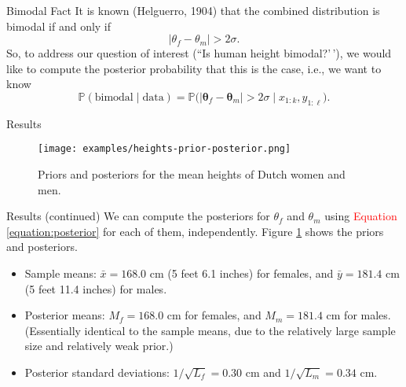 \documentclass[
  ignorenonframetext,
]{beamer}
\newcommand{\btheta}{{\bm\theta}}
\renewcommand{\Pr}{\mathbb{P}}
\begin{document}
\begin{frame}{Bimodal Fact}
\protect\hypertarget{bimodal-fact}{}
It is known (Helguerro, 1904) that the combined distribution is bimodal
if and only if \[ |\theta_f-\theta_m|>2\sigma. \] So, to address our
question of interest (``Is human height bimodal?'\,'), we would like to
compute the posterior probability that this is the case, i.e., we want
to know
\[ \Pr(\text{bimodal}\mid \text{data}) = \Pr\big(|\btheta_f-\btheta_m|>2\sigma \mid x_{1:k},y_{1:\ell}\big).\]
\end{frame}

\begin{frame}{Results}
\protect\hypertarget{results}{}
\begin{figure}
  \begin{center}
    \texttt{[image: examples/heights-prior-posterior.png]}
  \end{center}
  \caption{Priors and posteriors for the mean heights of Dutch women and men.}
  \label{figure:heights-prior-posterior}
\end{figure}
\end{frame}

\begin{frame}{Results (continued)}
\protect\hypertarget{results-continued}{}
We can compute the posteriors for \(\theta_f\) and \(\theta_m\) using
\textcolor{red}{Equation \ref{equation:posterior}} for each of them,
independently. Figure \ref{figure:heights-prior-posterior} shows the
priors and posteriors.

\begin{itemize}
\item Sample means: $\bar x = 168.0$ cm (5 feet 6.1 inches) for females, and $\bar y = 181.4$ cm (5 feet 11.4 inches) for males.
\item Posterior means: $M_f = 168.0$ cm for females, and $M_m = 181.4$ cm for males. (Essentially identical to the sample means, due to the relatively large sample size and relatively weak prior.)
\item Posterior standard deviations: $1/\sqrt{L_f} = 0.30$ cm and $1/\sqrt{L_m} = 0.34$ cm.
\end{itemize}
\end{frame}
\end{document}
